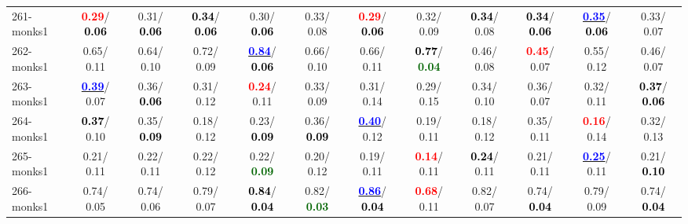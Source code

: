\begin{table}[h]
\begin{center}
{\begin{tabular}{lc|c|c|c|c|c|c|c|c|c|c}
261-monks1 & \textcolor{red}{\textbf{  0.29}}/\textcolor{black}{\textbf{  0.06}} &   0.31/\textcolor{black}{\textbf{  0.06}} & \textcolor{black}{\textbf{  0.34}}/\textcolor{black}{\textbf{  0.06}} &   0.30/\textcolor{black}{\textbf{  0.06}} &   0.33/  0.08 & \textcolor{red}{\textbf{  0.29}}/\textcolor{black}{\textbf{  0.06}} &   0.32/  0.09 & \textcolor{black}{\textbf{  0.34}}/  0.08 & \textcolor{black}{\textbf{  0.34}}/\textcolor{black}{\textbf{  0.06}} & \underline{\textcolor{blue}{\textbf{  0.35}}}/\textcolor{black}{\textbf{  0.06}} &   0.33/  0.07 \\
262-monks1 &   0.65/  0.11 &   0.64/  0.10 &   0.72/  0.09 & \underline{\textcolor{blue}{\textbf{  0.84}}}/\textcolor{black}{\textbf{  0.06}} &   0.66/  0.10 &   0.66/  0.11 & \textcolor{black}{\textbf{  0.77}}/\textcolor{darkgreen}{\textbf{  0.04}} &   0.46/  0.08 & \textcolor{red}{\textbf{  0.45}}/  0.07 &   0.55/  0.12 &   0.46/  0.07 \\
263-monks1 & \underline{\textcolor{blue}{\textbf{  0.39}}}/  0.07 &   0.36/\textcolor{black}{\textbf{  0.06}} &   0.31/  0.12 & \textcolor{red}{\textbf{  0.24}}/  0.11 &   0.33/  0.09 &   0.31/  0.14 &   0.29/  0.15 &   0.34/  0.10 &   0.36/  0.07 &   0.32/  0.11 & \textcolor{black}{\textbf{  0.37}}/\textcolor{black}{\textbf{  0.06}} \\ \hline
264-monks1 & \textcolor{black}{\textbf{  0.37}}/  0.10 &   0.35/\textcolor{black}{\textbf{  0.09}} &   0.18/  0.12 &   0.23/\textcolor{black}{\textbf{  0.09}} &   0.36/\textcolor{black}{\textbf{  0.09}} & \underline{\textcolor{blue}{\textbf{  0.40}}}/  0.12 &   0.19/  0.11 &   0.18/  0.12 &   0.35/  0.11 & \textcolor{red}{\textbf{  0.16}}/  0.14 &   0.32/  0.13 \\
265-monks1 &   0.21/  0.11 &   0.22/  0.11 &   0.22/  0.12 &   0.22/\textcolor{darkgreen}{\textbf{  0.09}} &   0.20/  0.12 &   0.19/  0.11 & \textcolor{red}{\textbf{  0.14}}/  0.11 & \textcolor{black}{\textbf{  0.24}}/  0.11 &   0.21/  0.11 & \underline{\textcolor{blue}{\textbf{  0.25}}}/  0.11 &   0.21/\textcolor{black}{\textbf{  0.10}} \\
266-monks1 &   0.74/  0.05 &   0.74/  0.06 &   0.79/  0.07 & \textcolor{black}{\textbf{  0.84}}/\textcolor{black}{\textbf{  0.04}} &   0.82/\textcolor{darkgreen}{\textbf{  0.03}} & \underline{\textcolor{blue}{\textbf{  0.86}}}/\textcolor{black}{\textbf{  0.04}} & \textcolor{red}{\textbf{  0.68}}/  0.11 &   0.82/  0.07 &   0.74/\textcolor{black}{\textbf{  0.04}} &   0.79/  0.09 &   0.74/\textcolor{black}{\textbf{  0.04}} \\

\end{tabular}}
\end{center}
\end{table}
